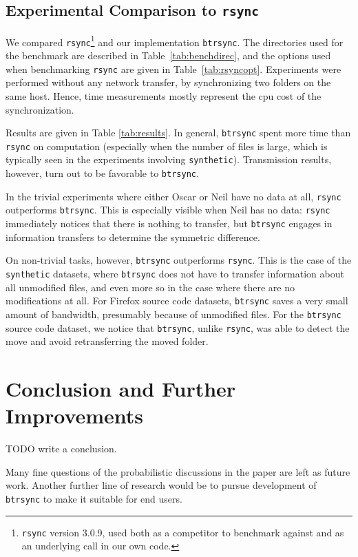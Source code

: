 \documentclass[11pt]{llncs}
\newcommand{\btrsync}{\texttt{btrsync}\xspace}
\newcommand{\rsync}{\texttt{rsync}\xspace}
\newcommand{\comm}[1]{\marginpar{%
\vskip-\baselineskip %
\raggedright\footnotesize
\itshape\hrule\smallskip#1\par\smallskip\hrule}}
\begin{document}
\subsection{Experimental Comparison to \rsync}

We compared \rsync\footnote{\rsync version 3.0.9, used both as a competitor to
benchmark against and as an underlying call in our own code.} and our implementation \btrsync. The directories used for the
benchmark are described in Table~\ref{tab:benchdirec}, and the options used
when benchmarking \rsync are given in Table~\ref{tab:rsyncopt}. Experiments
were performed without any network transfer, by synchronizing two folders on
the same host. Hence, time measurements mostly represent the {\sc cpu} cost of
the synchronization.\smallskip

Results are given in Table \ref{tab:results}. In general, \btrsync spent more time than \rsync on computation (especially when the number of files is large, which is typically seen in the experiments involving {\tt synthetic}). Transmission results, however, turn out to be favorable to \btrsync.\smallskip

In the trivial experiments where either Oscar or Neil have no data at all, \rsync outperforms \btrsync. This is especially visible when Neil has no data: \rsync immediately notices that there is nothing to transfer, but \btrsync engages in information transfers to determine the symmetric
difference.\smallskip

On non-trivial tasks, however, \btrsync outperforms \rsync. This is the case of the {\tt synthetic} datasets, where \btrsync does not have to transfer
information about all unmodified files, and even more so in the case where there are no modifications at all. For Firefox source code datasets, \btrsync saves a very small amount of bandwidth, presumably because of unmodified files. For the \btrsync source code dataset, we notice that \btrsync, unlike \rsync, was able to detect the move and avoid retransferring the moved folder.

\section{Conclusion and Further Improvements}

TODO write a conclusion.

Many fine questions of the probabilistic discussions in the paper are left as future work.\comm{Be more specific!} Another further line of research would be to pursue development of \btrsync to make it suitable for end users.
\end{document}
